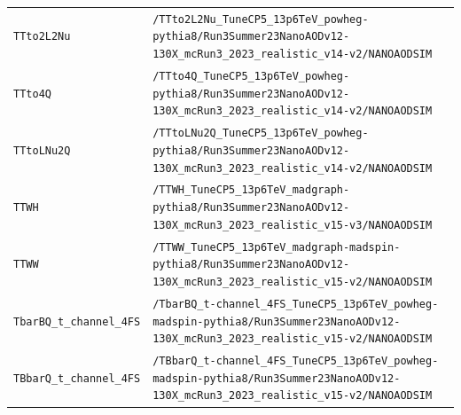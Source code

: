 \begin{longtable}{@{}>{\RaggedRight\arraybackslash}p{} >{\RaggedRight\arraybackslash}p{}@{}}
\addlinespace[2pt]
\texttt{TTto2L2Nu} & \texttt{/\allowbreak{}TTto2L2Nu\_\allowbreak{}TuneCP5\_\allowbreak{}13p6TeV\_\allowbreak{}powheg-\allowbreak{}pythia8/\allowbreak{}Run3Summer23NanoAODv12-\allowbreak{}130X\_\allowbreak{}mcRun3\_\allowbreak{}2023\_\allowbreak{}realistic\_\allowbreak{}v14-\allowbreak{}v2/\allowbreak{}NANOAODSIM} \\
\addlinespace[2pt]
\texttt{TTto4Q} & \texttt{/\allowbreak{}TTto4Q\_\allowbreak{}TuneCP5\_\allowbreak{}13p6TeV\_\allowbreak{}powheg-\allowbreak{}pythia8/\allowbreak{}Run3Summer23NanoAODv12-\allowbreak{}130X\_\allowbreak{}mcRun3\_\allowbreak{}2023\_\allowbreak{}realistic\_\allowbreak{}v14-\allowbreak{}v2/\allowbreak{}NANOAODSIM} \\
\addlinespace[2pt]
\texttt{TTtoLNu2Q} & \texttt{/\allowbreak{}TTtoLNu2Q\_\allowbreak{}TuneCP5\_\allowbreak{}13p6TeV\_\allowbreak{}powheg-\allowbreak{}pythia8/\allowbreak{}Run3Summer23NanoAODv12-\allowbreak{}130X\_\allowbreak{}mcRun3\_\allowbreak{}2023\_\allowbreak{}realistic\_\allowbreak{}v14-\allowbreak{}v2/\allowbreak{}NANOAODSIM} \\
\addlinespace[2pt]
\texttt{TTWH} & \texttt{/\allowbreak{}TTWH\_\allowbreak{}TuneCP5\_\allowbreak{}13p6TeV\_\allowbreak{}madgraph-\allowbreak{}pythia8/\allowbreak{}Run3Summer23NanoAODv12-\allowbreak{}130X\_\allowbreak{}mcRun3\_\allowbreak{}2023\_\allowbreak{}realistic\_\allowbreak{}v15-\allowbreak{}v3/\allowbreak{}NANOAODSIM} \\
\addlinespace[2pt]
\texttt{TTWW} & \texttt{/\allowbreak{}TTWW\_\allowbreak{}TuneCP5\_\allowbreak{}13p6TeV\_\allowbreak{}madgraph-\allowbreak{}madspin-\allowbreak{}pythia8/\allowbreak{}Run3Summer23NanoAODv12-\allowbreak{}130X\_\allowbreak{}mcRun3\_\allowbreak{}2023\_\allowbreak{}realistic\_\allowbreak{}v15-\allowbreak{}v2/\allowbreak{}NANOAODSIM} \\
\addlinespace[2pt]
\texttt{TbarBQ\_\allowbreak{}t\_\allowbreak{}channel\_\allowbreak{}4FS} & \texttt{/\allowbreak{}TbarBQ\_\allowbreak{}t-\allowbreak{}channel\_\allowbreak{}4FS\_\allowbreak{}TuneCP5\_\allowbreak{}13p6TeV\_\allowbreak{}powheg-\allowbreak{}madspin-\allowbreak{}pythia8/\allowbreak{}Run3Summer23NanoAODv12-\allowbreak{}130X\_\allowbreak{}mcRun3\_\allowbreak{}2023\_\allowbreak{}realistic\_\allowbreak{}v15-\allowbreak{}v2/\allowbreak{}NANOAODSIM} \\
\addlinespace[2pt]
\texttt{TBbarQ\_\allowbreak{}t\_\allowbreak{}channel\_\allowbreak{}4FS} & \texttt{/\allowbreak{}TBbarQ\_\allowbreak{}t-\allowbreak{}channel\_\allowbreak{}4FS\_\allowbreak{}TuneCP5\_\allowbreak{}13p6TeV\_\allowbreak{}powheg-\allowbreak{}madspin-\allowbreak{}pythia8/\allowbreak{}Run3Summer23NanoAODv12-\allowbreak{}130X\_\allowbreak{}mcRun3\_\allowbreak{}2023\_\allowbreak{}realistic\_\allowbreak{}v15-\allowbreak{}v2/\allowbreak{}NANOAODSIM} \\

\end{longtable}
